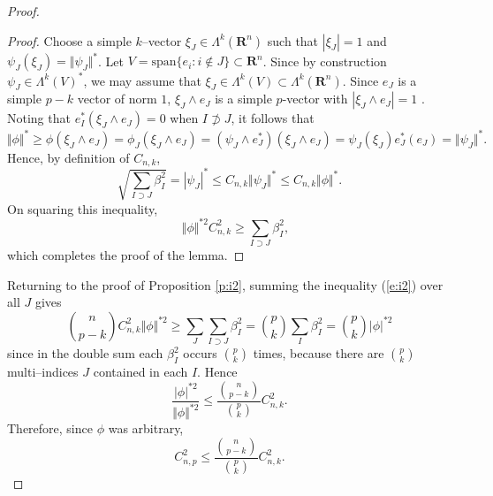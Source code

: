 \documentclass[10pt,a4paper]{amsart}
\begin{document}
\begin{proof}
 \begin{proof}
 Choose a simple $k$--vector  $\xi_J \in \Lambda^k(\mathbf{R}^n)$ such that $|\xi_J|=1$ and $ \psi_J(\xi_J) = \Vert \psi_J\Vert^\ast$. Let $V = \mathrm{span}\{ e_i : i \notin J\} \subset \mathbf{R}^n$. Since by construction $ \psi_J \in \Lambda^k(V)^\ast$, we may assume that $ \xi_J \in \Lambda^k(V) \subset \Lambda^k(\mathbf{R}^n)$.  Since $e_J$ is a simple $p-k$ vector of norm $1$, $ \xi_J \wedge e_J$ is a simple $p$-vector with $| \xi_J \wedge e_J|=1$ . Noting that $e_I^\ast(\xi_J\wedge e_J)=0$ when $I\not\supset J$, it follows that
 \begin{equation*}\Vert \phi\Vert^\ast \geq  \phi( \xi_J \wedge e_J)=  \phi_J( \xi_J \wedge e_J) = (\psi_J\wedge e_J^\ast)( \xi_J \wedge e_J)=\psi_J(\xi_J)e_J^\ast(e_J)  =  \Vert \psi_J\Vert^\ast.
 \end{equation*}
Hence, by definition of $C_{n,k}$,
\begin{equation*}
  \sqrt{\sum_{I \supset J} \beta_I^2} = |\psi_J|^\ast \leq C_{n,k} \Vert \psi_J\Vert^\ast \leq C_{n,k} \Vert \phi \Vert^\ast.
 \end{equation*} 
On squaring this inequality,
 \begin{equation*}
 \quad  \Vert \phi\Vert^{\ast2} C_{n,k}^2 \geq \sum_{I \supset J} \beta_I^2,
 \end{equation*}
 which completes the proof of the lemma.
 \end{proof}
 
 Returning to the proof of Proposition \ref{p:i2}, summing the inequality (\ref{e:i2}) over all $J$ gives
 \begin{equation*}
  \binom{n}{p-k}  C_{n,k}^2 \Vert \phi\Vert^{\ast2} \geq \sum_J\sum_{I \supset J} \beta_I^2 = \binom{p}{k}\sum_I \beta_I^2 =\binom{p}{k} |\phi|^{\ast 2}
  \end{equation*} 
 since in the double sum each $\beta_I^2$ occurs $\binom{p}{k}$ times, because there are $\binom{p}{k}$ multi--indices $J$ contained in each $I$.
 Hence
 \begin{equation*}
  \frac {|\phi|^{\ast 2}}{\Vert \phi\Vert^{\ast2}} \leq   \frac {\binom{n}{p-k}}{\binom{p}{k}} C_{n,k}^2. 
  \end{equation*}
 Therefore, since $\phi$ was arbitrary,
 \begin{equation*}
 C_{n,p}^2 \leq \frac {\binom{n}{p-k}}{\binom{p}{k}} C_{n,k}^2.
 \end{equation*}
 \end{proof}
\end{document}
